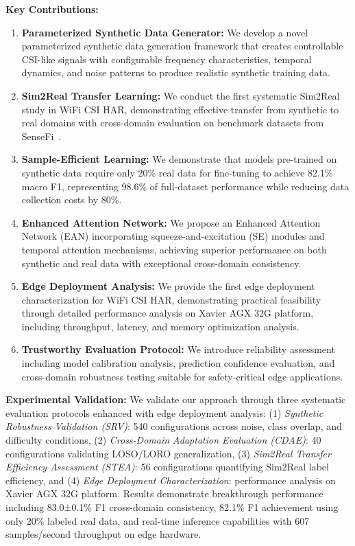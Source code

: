 \documentclass[journal]{IEEEtran}
\begin{document}
\textbf{Key Contributions:}
\begin{enumerate}
\item \textbf{Parameterized Synthetic Data Generator:} We develop a novel parameterized synthetic data generation framework that creates controllable CSI-like signals with configurable frequency characteristics, temporal dynamics, and noise patterns to produce realistic synthetic training data.

\item \textbf{Sim2Real Transfer Learning:} We conduct the first systematic Sim2Real study in WiFi CSI HAR, demonstrating effective transfer from synthetic to real domains with cross-domain evaluation on benchmark datasets from SenseFi~\cite{yang2023sensefi}.

\item \textbf{Sample-Efficient Learning:} We demonstrate that models pre-trained on synthetic data require only 20\% real data for fine-tuning to achieve 82.1\% macro F1, representing 98.6\% of full-dataset performance while reducing data collection costs by 80\%.

\item \textbf{Enhanced Attention Network:} We propose an Enhanced Attention Network (EAN) incorporating squeeze-and-excitation (SE) modules and temporal attention mechanisms, achieving superior performance on both synthetic and real data with exceptional cross-domain consistency.

\item \textbf{Edge Deployment Analysis:} We provide the first edge deployment characterization for WiFi CSI HAR, demonstrating practical feasibility through detailed performance analysis on Xavier AGX 32G platform, including throughput, latency, and memory optimization analysis.

\item \textbf{Trustworthy Evaluation Protocol:} We introduce reliability assessment including model calibration analysis, prediction confidence evaluation, and cross-domain robustness testing suitable for safety-critical edge applications.
\end{enumerate}

\textbf{Experimental Validation:} We validate our approach through three systematic evaluation protocols enhanced with edge deployment analysis: (1) \textit{Synthetic Robustness Validation (SRV)}: 540 configurations across noise, class overlap, and difficulty conditions, (2) \textit{Cross-Domain Adaptation Evaluation (CDAE)}: 40 configurations validating LOSO/LORO generalization, (3) \textit{Sim2Real Transfer Efficiency Assessment (STEA)}: 56 configurations quantifying Sim2Real label efficiency, and (4) \textit{Edge Deployment Characterization}: performance analysis on Xavier AGX 32G platform. Results demonstrate breakthrough performance including 83.0±0.1\% F1 cross-domain consistency, 82.1\% F1 achievement using only 20\% labeled real data, and real-time inference capabilities with 607 samples/second throughput on edge hardware.
\end{document}
